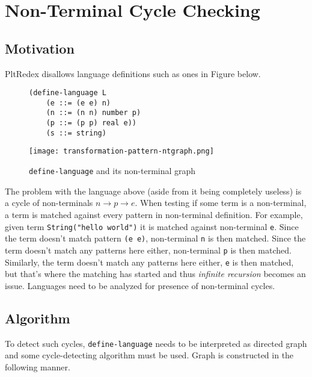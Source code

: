 \section{Non-Terminal Cycle Checking}

\subsection{Motivation}
PltRedex disallows language definitions such as ones in Figure below. 

\begin{figure}[H]
\begin{minipage}{0.45\linewidth}
	\centering
\begin{verbatim}
(define-language L
	(e ::= (e e) n)
	(n ::= (n n) number p)
	(p ::= (p p) real e))
	(s ::= string)
\end{verbatim}
\end{minipage}
\begin{minipage}{0.45\linewidth}
	\centering
	\texttt{[image: transformation-pattern-ntgraph.png]}
\end{minipage}
	\caption{\texttt{define-language} and its non-terminal graph}
	\label{dl-ntcyclegraph}
\end{figure}

The problem with the language above (aside from it being completely useless) is a cycle of non-terminals $n \rightarrow p \rightarrow e$. When testing if some term is a non-terminal, a term is matched against every pattern in non-terminal definition. For example, given term \texttt{String("hello world")} it is matched against non-terminal \texttt{e}. Since  the term doesn't match pattern \texttt{(e e)}, non-terminal \texttt{n} is then matched. Since the term doesn't match any patterns here either, non-terminal \texttt{p} is then matched. Similarly, the term doesn't match any patterns here either, \texttt{e} is then matched, but that's where the matching has started and thus \textit{infinite recursion} becomes an issue. Languages need to be analyzed for presence of non-terminal cycles.

\subsection{Algorithm}
To detect such cycles, \texttt{define-language} needs to be interpreted as directed graph and some cycle-detecting algorithm must be used. Graph is constructed in the following manner.

